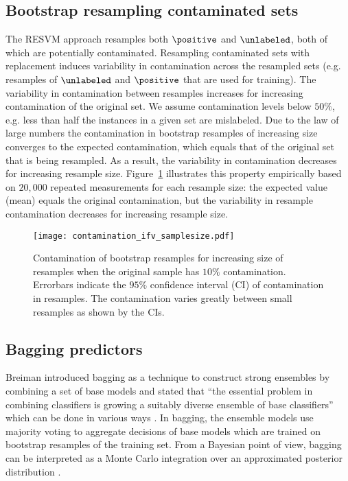 

\subsection{Bootstrap resampling contaminated sets} \label{resampling}

The RESVM approach resamples both $\positive$ and $\unlabeled$, both of which are potentially contaminated. Resampling contaminated sets with replacement induces variability in contamination across the resampled sets (e.g. resamples of $\unlabeled$ and $\positive$ that are used for training). The variability in contamination between resamples increases for increasing contamination of the original set. We assume contamination levels below $50\%$, e.g. less than half the instances in a given set are mislabeled. Due to the law of large numbers the contamination in bootstrap resamples of increasing size converges to the expected contamination, which equals that of the original set that is being resampled. As a result, the variability in contamination decreases for increasing resample size. Figure~\ref{fig:contamination} illustrates this property empirically based on $20,000$ repeated measurements for each resample size: the expected value (mean) equals the original contamination, but the variability in resample contamination decreases for increasing resample size.

\begin{figure}[!h]
  \centering
  \texttt{[image: contamination\_ifv\_samplesize.pdf]}
  \caption{Contamination of bootstrap resamples for increasing size of resamples when the original sample has $10\%$ contamination. Errorbars indicate the $95\%$ confidence interval (CI) of contamination in resamples. The contamination varies greatly between small resamples as shown by the CIs. } 
  \label{fig:contamination}
\end{figure}


\subsection{Bagging predictors}
Breiman \citep{Breiman:1996:BP:231986.231989} introduced bagging as a technique to construct strong ensembles by combining a set of base models and stated that ``the essential problem in combining classifiers is growing a suitably diverse ensemble of base classifiers'' which can be done in various ways \citep{brown2005diversity}. In bagging, the ensemble models use majority voting to aggregate decisions of base models which are trained on bootstrap resamples of the training set. From a Bayesian point of view, bagging can be interpreted as a Monte Carlo integration over an approximated posterior distribution \citep{rao1997out}. 

